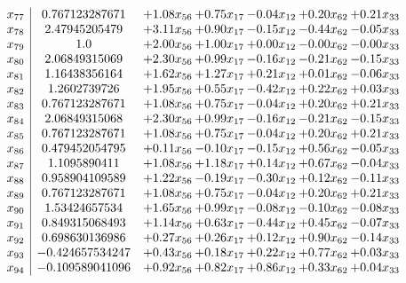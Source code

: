 \documentclass[8pt]{article}
\begin{document}
\[\begin{array}{c| c c@{\hskip 2pt} c@{\hskip 2pt} c@{\hskip 2pt} c@{\hskip 2pt} c@{\hskip 2pt} }
 x_{77}   &  0.767123287671 & +  1.08 x_{56} & +  0.75 x_{17} & -0.04 x_{12} & +  0.20 x_{62} & +  0.21 x_{33}\\
 x_{78}   &  2.47945205479 & +  3.11 x_{56} & +  0.90 x_{17} & -0.15 x_{12} & -0.44 x_{62} & -0.05 x_{33}\\
 x_{79}   &  1.0 & +  2.00 x_{56} & +  1.00 x_{17} & +  0.00 x_{12} & -0.00 x_{62} & -0.00 x_{33}\\
 x_{80}   &  2.06849315069 & +  2.30 x_{56} & +  0.99 x_{17} & -0.16 x_{12} & -0.21 x_{62} & -0.15 x_{33}\\
 x_{81}   &  1.16438356164 & +  1.62 x_{56} & +  1.27 x_{17} & +  0.21 x_{12} & +  0.01 x_{62} & -0.06 x_{33}\\
 x_{82}   &  1.2602739726 & +  1.95 x_{56} & +  0.55 x_{17} & -0.42 x_{12} & +  0.22 x_{62} & +  0.03 x_{33}\\
 x_{83}   &  0.767123287671 & +  1.08 x_{56} & +  0.75 x_{17} & -0.04 x_{12} & +  0.20 x_{62} & +  0.21 x_{33}\\
 x_{84}   &  2.06849315068 & +  2.30 x_{56} & +  0.99 x_{17} & -0.16 x_{12} & -0.21 x_{62} & -0.15 x_{33}\\
 x_{85}   &  0.767123287671 & +  1.08 x_{56} & +  0.75 x_{17} & -0.04 x_{12} & +  0.20 x_{62} & +  0.21 x_{33}\\
 x_{86}   &  0.479452054795 & +  0.11 x_{56} & -0.10 x_{17} & -0.15 x_{12} & +  0.56 x_{62} & -0.05 x_{33}\\
 x_{87}   &  1.1095890411 & +  1.08 x_{56} & +  1.18 x_{17} & +  0.14 x_{12} & +  0.67 x_{62} & -0.04 x_{33}\\
 x_{88}   &  0.958904109589 & +  1.22 x_{56} & -0.19 x_{17} & -0.30 x_{12} & +  0.12 x_{62} & -0.11 x_{33}\\
 x_{89}   &  0.767123287671 & +  1.08 x_{56} & +  0.75 x_{17} & -0.04 x_{12} & +  0.20 x_{62} & +  0.21 x_{33}\\
 x_{90}   &  1.53424657534 & +  1.65 x_{56} & +  0.99 x_{17} & -0.08 x_{12} & -0.10 x_{62} & -0.08 x_{33}\\
 x_{91}   &  0.849315068493 & +  1.14 x_{56} & +  0.63 x_{17} & -0.44 x_{12} & +  0.45 x_{62} & -0.07 x_{33}\\
 x_{92}   &  0.698630136986 & +  0.27 x_{56} & +  0.26 x_{17} & +  0.12 x_{12} & +  0.90 x_{62} & -0.14 x_{33}\\
 x_{93}   &  -0.424657534247 & +  0.43 x_{56} & +  0.18 x_{17} & +  0.22 x_{12} & +  0.77 x_{62} & +  0.03 x_{33}\\
 x_{94}   &  -0.109589041096 & +  0.92 x_{56} & +  0.82 x_{17} & +  0.86 x_{12} & +  0.33 x_{62} & +  0.04 x_{33}\\

\end{array}\]
\end{document}
